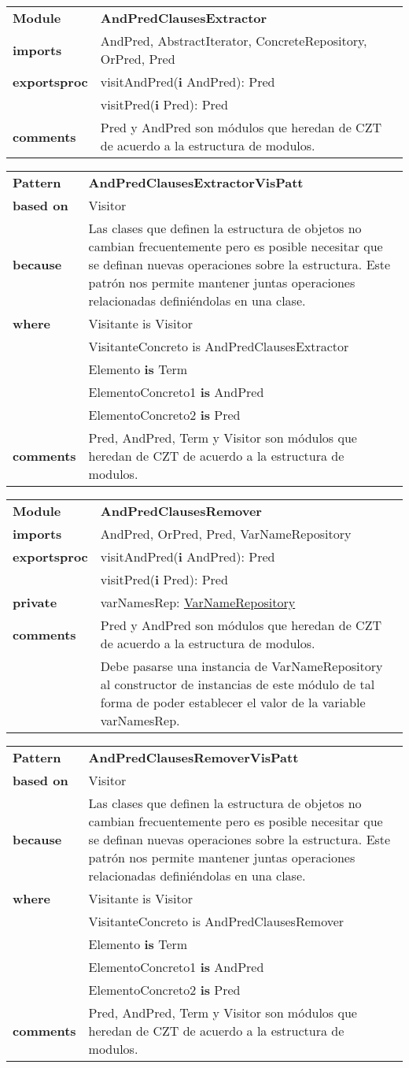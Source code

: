 \documentclass[12pt,a4paper,fleqn]{report}
\newenvironment{module}[1]{\hypertarget{mi:#1}{} \vspace{0.5cm}\noindent\begin{tabular}{|p{0.2\textwidth} p{0.75\textwidth}|} \hline{\bf Module} & {\bf #1} \\}{\hline\end{tabular}\vspace{0.5cm}}
\newcommand{\eproc}{{\bf exportsproc}}
\newcommand{\priv}{{\bf private}}
\newcommand{\proc}[1]{& #1 \\}
\newcommand{\eb}[1]{{\bf i} #1}
\newcommand{\imp}[1]{{\bf imports} & #1 \\}
\newcommand{\comm}[1]{{\bf comments} & #1 \\}
\newcommand{\mdr}[1]{\hyperlink{mi:#1}{#1}}
\newcommand{\extraline}[1]{& #1 \\}
\newenvironment{pattern}[1]{\vspace{0.5cm}\noindent\begin{tabular}{|p{0.2\textwidth} p{0.70\textwidth}|} \hline{\bf Pattern} & {\bf #1} \\}{\hline\end{tabular}\vspace{0.5cm}}
\newcommand{\based}[1]{{\bf based on} & #1 \\}
\newcommand{\bec}[1]{{\bf because} & #1 \\}
\newcommand{\pwhere}{{\bf where}}
\newcommand{\is}{{\bf is} }
\begin{document}
\begin{module}{AndPredClausesExtractor}
\imp{AndPred, AbstractIterator, ConcreteRepository, OrPred, Pred}
\eproc
\proc{visitAndPred(\eb {AndPred}): Pred}	
\proc{visitPred(\eb {Pred}): Pred}	
\comm{Pred y AndPred son módulos que heredan de CZT de acuerdo a la estructura de modulos.}
\end{module}



\begin{pattern}{AndPredClausesExtractorVisPatt}
\based{Visitor}
\bec{Las clases que definen la estructura de objetos no cambian frecuentemente pero es posible necesitar que se definan nuevas operaciones sobre la estructura. Este patrón nos permite mantener juntas operaciones relacionadas definiéndolas en una clase.}
\pwhere
\proc{Visitante is Visitor}
\proc{VisitanteConcreto is AndPredClausesExtractor}
\proc{Elemento \is Term}
\proc{ElementoConcreto1 \is AndPred}
\proc{ElementoConcreto2 \is Pred}
\comm{Pred, AndPred, Term y Visitor son módulos que heredan de CZT de acuerdo a la estructura de modulos.}
\end{pattern}



\begin{module}{AndPredClausesRemover}
\imp{AndPred, OrPred, Pred, VarNameRepository}
\eproc
\proc{visitAndPred(\eb {AndPred}): Pred}
\proc{visitPred(\eb {Pred}): Pred}
\priv
\proc{varNamesRep: \mdr{VarNameRepository}}
\comm{Pred y AndPred son módulos que heredan de CZT de acuerdo a la estructura de modulos.}
\extraline{Debe pasarse una instancia de VarNameRepository al constructor de instancias de este módulo de tal forma de poder establecer el valor de la variable varNamesRep.}
\end{module}



\begin{pattern}{AndPredClausesRemoverVisPatt}
\based{Visitor}
\bec{Las clases que definen la estructura de objetos no cambian frecuentemente pero es posible necesitar que se definan nuevas operaciones sobre la estructura. Este patrón nos permite mantener juntas operaciones relacionadas definiéndolas en una clase.}
\pwhere
\proc{Visitante is Visitor}
\proc{VisitanteConcreto is AndPredClausesRemover}
\proc{Elemento \is Term}
\proc{ElementoConcreto1 \is AndPred}
\proc{ElementoConcreto2 \is Pred}
\comm{Pred, AndPred, Term y Visitor son módulos que heredan de CZT de acuerdo a la estructura de modulos.}
\end{pattern}
\end{document}
